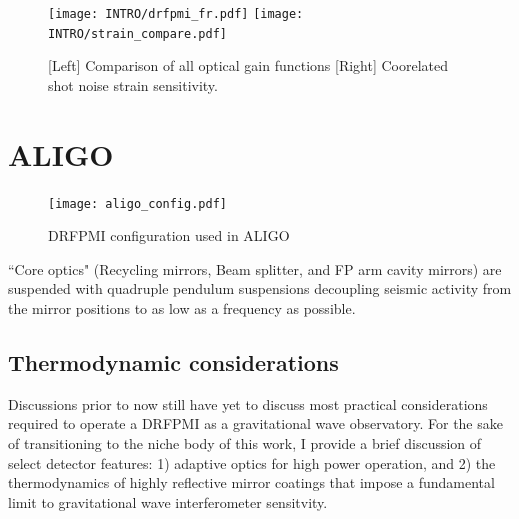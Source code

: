 \begin{figure}[h!]
  \begin{subcaptiongroup}
	  \texttt{[image: INTRO/drfpmi\_fr.pdf]}
 	  \texttt{[image: INTRO/strain\_compare.pdf]}
  \end{subcaptiongroup}
  \hfill
  \caption{[Left] Comparison of all optical gain functions [Right] Coorelated shot noise strain sensitivity.}
  \label{fig:drfpmi_gain_and_strain}
\end{figure}

\section{ALIGO}

\begin{figure}[H]
  \begin{center}
	  \texttt{[image: aligo\_config.pdf]}
  \end{center}
  \caption{DRFPMI configuration used in ALIGO}
  \label{fig:simple_michelson}
\end{figure}

``Core optics" (Recycling mirrors, Beam splitter, and FP arm cavity mirrors) are suspended with quadruple pendulum suspensions decoupling seismic activity from the mirror positions to as low as a frequency as possible. 

\subsection{Thermodynamic considerations}
Discussions prior to now still have yet to discuss most practical considerations required to operate a DRFPMI as a gravitational wave observatory. For the sake of transitioning to the niche body of this work, I provide a brief discussion of select detector features: 1) adaptive optics for high power operation, and 2) the thermodynamics of highly reflective mirror coatings that impose a fundamental limit to gravitational wave interferometer sensitvity. 


